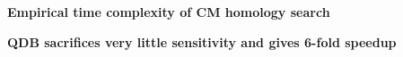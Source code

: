 \documentclass[landscape]{slides}
\begin{document}

\begin{slide}
\begin{center}
\textbf{Empirical time complexity of CM homology search}
\end{center}


\vfill
\end{slide}

\begin{slide}
\begin{center}
\textbf{QDB sacrifices very little sensitivity and gives 6-fold speedup}
\end{center}


\vfill
\end{slide}
\end{document}
